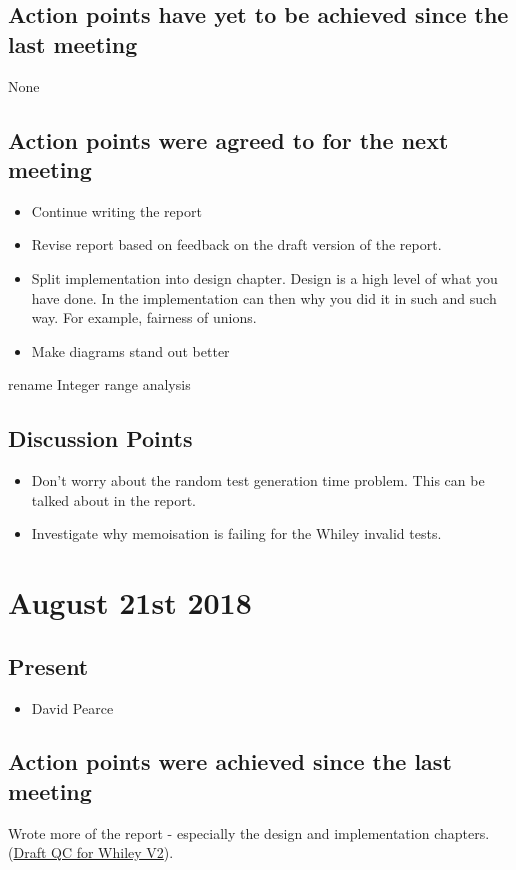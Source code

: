\documentclass[]{article}
\begin{document}
\subsection{Action points have yet to be achieved since the last meeting}
None
\subsection{Action points were agreed to for the next meeting}
\begin{itemize}
	\item Continue writing the report 
	\item Revise report based on feedback on the draft version of the report.
	\item Split implementation into design chapter. Design is a high level of what you have done. In the implementation can then why you did it in such and such way. For example, fairness of unions.
	\item Make diagrams stand out better
\end{itemize}
rename Integer range analysis
\subsection{Discussion Points}
\begin{itemize}
	\item Don't worry about the random test generation time problem. This can be talked about in the report.
	\item Investigate why memoisation is failing for the Whiley invalid tests.
\end{itemize}

\section{August 21st 2018}
\subsection{Present}
\begin{itemize}
	\item David Pearce
\end{itemize}

\subsection{Action points were achieved since the last meeting}
Wrote more of the report - especially the design and implementation chapters.
(\href{https://gitlab.ecs.vuw.ac.nz/project489-2018/chinjani/quickcheck-for-whiley-final-report/blob/master/Draft%20V2%20QuickCheck%20for%20Whiley%20-%20Janice%20Chin.pdf}{Draft QC for Whiley V2}). 
\end{document}
